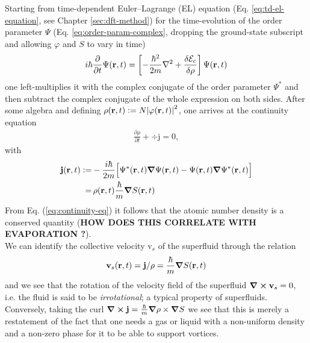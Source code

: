 \documentclass[12pt,a4paper,twosides]{book}
\renewcommand{\vec}[1]{\bm{\mathrm{#1}}}
\begin{document}
			Starting from time-dependent Euler--Lagrange (EL) equation (Eq. \ref{eq:td-el-equation}, see Chapter \ref{sec:dft-method}) for the time-evolution of the order parameter $\Psi$ (Eq. \ref{eq:order-param-complex}, dropping the ground-state subscript and allowing $\varphi$ and $S$ to vary in time)
			\begin{align}
				i\hbar\frac{\partial}{\partial t} \Psi({\mathbf r},t) = \left[-\frac{\hbar^2}{2m}\laplacian + \frac{\delta{\cal E}_{c}}{\delta\rho}\right]\Psi(\textbf{r},t)
			\end{align}
			one left-multiplies it with the complex conjugate of the order parameter $\Psi^*$ and then subtract the complex conjugate of the whole expression on both sides. After some algebra and defining $\rho(\vec{r},t)\vcentcolon=N\abs{\varphi(\vec{r},t)}^2$, one arrives at the continuity equation
			\begin{align}
				\frac{\partial\rho}{\partial t} + \div{\vec{j}}=0, \label{eq:continuity-eq}
			\end{align}
			with
			\begin{align}
				\vec{j}(\vec{r},t) \vcentcolon=& -\frac{i\hbar}{2m}\qty\Big[\Psi^*(\vec{r},t)\grad{\Psi}(\vec{r},t) - \Psi(\vec{r},t)\grad{\Psi^*}(\vec{r},t)] \\
					=&\,\rho(\vec{r},t)\frac{\hbar}{m}\grad{S(\vec{r},t)}
			\end{align}
			From Eq. (\ref{eq:continuity-eq}) it follows that the atomic number density is a conserved quantity (\textbf{HOW DOES THIS CORRELATE WITH EVAPORATION ?}).\\
			
			We can identify the collective velocity $\vec{v}_s$ of the superfluid through the relation
			\begin{align}
				\vec{v}_s(\vec{r},t) = \vec{j}/\rho=\frac{\hbar}{m}\grad{S(\vec{r},t)} \label{eq:velocity-field}
			\end{align}
			and we see that the rotation of the velocity field of the superfluid $\curl{\vec{v}_s}=0$, i.e. the fluid is said to be \emph{irrotational}; a typical property of superfluids. Conversely, taking the curl $\curl{\vec{j}}=\frac{\hbar}{m}\grad{\rho}\times\grad{S}$ we see that this is merely a restatement of the fact that one needs a gas or liquid with a non-uniform density and a non-zero phase for it to be able to support vortices.\\
			
\end{document}
